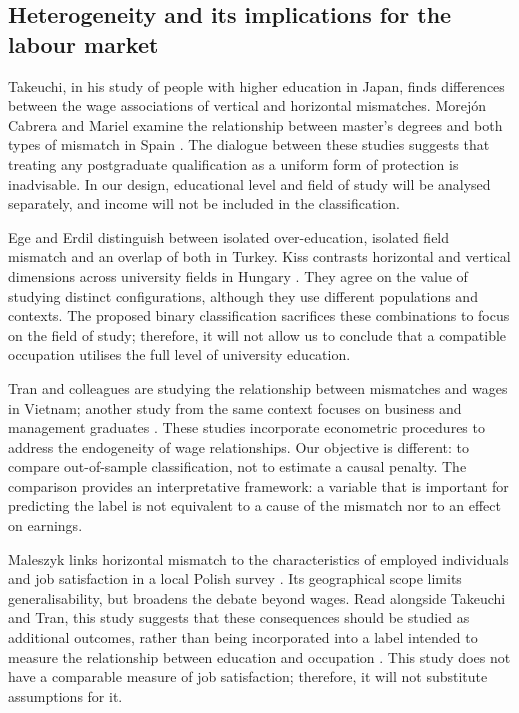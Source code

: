 \subsection{Heterogeneity and its implications for the labour market}



Takeuchi, in his study of people with higher education in Japan, finds differences between the wage associations of vertical and horizontal mismatches. Morejón Cabrera and Mariel examine the relationship between master's degrees and both types of mismatch in Spain \cite{MorejnCabrera2024,Takeuchi2023}. The dialogue between these studies suggests that treating any postgraduate qualification as a uniform form of protection is inadvisable. In our design, educational level and field of study will be analysed separately, and income will not be included in the classification.

Ege and Erdil distinguish between isolated over-education, isolated field mismatch and an overlap of both in Turkey. Kiss contrasts horizontal and vertical dimensions across university fields in Hungary \cite{Ege2023,Kiss2024}. They agree on the value of studying distinct configurations, although they use different populations and contexts. The proposed binary classification sacrifices these combinations to focus on the field of study; therefore, it will not allow us to conclude that a compatible occupation utilises the full level of university education.

Tran and colleagues are studying the relationship between mismatches and wages in Vietnam; another study from the same context focuses on business and management graduates \cite{Tran2023,Tran2025}. These studies incorporate econometric procedures to address the endogeneity of wage relationships. Our objective is different: to compare out-of-sample classification, not to estimate a causal penalty. The comparison provides an interpretative framework: a variable that is important for predicting the label is not equivalent to a cause of the mismatch nor to an effect on earnings.

Maleszyk links horizontal mismatch to the characteristics of employed individuals and job satisfaction in a local Polish survey \cite{Maleszyk2025}. Its geographical scope limits generalisability, but broadens the debate beyond wages. Read alongside Takeuchi and Tran, this study suggests that these consequences should be studied as additional outcomes, rather than being incorporated into a label intended to measure the relationship between education and occupation \cite{Takeuchi2023,Tran2025}. This study does not have a comparable measure of job satisfaction; therefore, it will not substitute assumptions for it.

